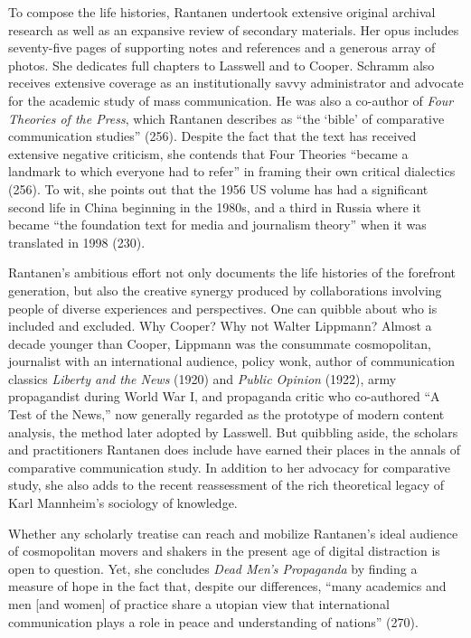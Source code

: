\documentclass{tufte-handout}
\begin{document}
To compose the life histories, Rantanen undertook extensive original
archival research as well as an expansive review of secondary materials.
Her opus includes seventy-five pages of supporting notes and references
and a generous array of photos. She dedicates full chapters to Lasswell
and to Cooper. Schramm also receives extensive coverage as an
institutionally savvy administrator and advocate for the academic study
of mass communication. He was also a co-author of \emph{Four Theories of
the Press}, which Rantanen describes as ``the `bible' of comparative
communication studies'' (256). Despite the fact that the text has
received extensive negative criticism, she contends that Four Theories
``became a landmark to which everyone had to refer'' in framing their
own critical dialectics (256). To wit, she points out that the 1956 US
volume has had a significant second life in China beginning in the
1980s, and a third in Russia where it became ``the foundation text for
media and journalism theory'' when it was translated in 1998 (230).

Rantanen's ambitious effort not only documents the life histories of the
forefront generation, but also the creative synergy produced by
collaborations involving people of diverse experiences and perspectives.
One can quibble about who is included and excluded. Why Cooper? Why not
Walter Lippmann? Almost a decade younger than Cooper, Lippmann was the
consummate cosmopolitan, journalist with an international audience,
policy wonk, author of communication classics \emph{Liberty and the
News} (1920) and \emph{Public Opinion} (1922), army propagandist during
World War I, and propaganda critic who co-authored ``A Test of the
News,'' now generally regarded as the prototype of modern content
analysis, the method later adopted by Lasswell. But quibbling aside, the
scholars and practitioners Rantanen does include have earned their
places in the annals of comparative communication study. In addition to
her advocacy for comparative study, she also adds to the recent
reassessment of the rich theoretical legacy of Karl Mannheim's sociology
of knowledge.

Whether any scholarly treatise can reach and mobilize Rantanen's ideal
audience of cosmopolitan movers and shakers in the present age of
digital distraction is open to question. Yet, she concludes \emph{Dead
Men's Propaganda} by finding a measure of hope in the fact that, despite
our differences, ``many academics and men {[}and women{]} of practice
share a utopian view that international communication plays a role in
peace and understanding of nations'' (270).
\end{document}
